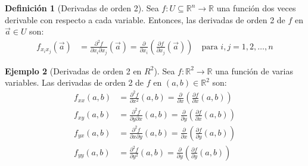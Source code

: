\documentclass{article}
\newcommand{\R}{\mathbb{R}}
\newcommand{\vect}[1]{\vec{#1}}
\theoremstyle{definition}
\newtheorem{definition}{Definición}[section]
\newtheorem{example}[definition]{Ejemplo}
\theoremstyle{plain}
\theoremstyle{remark}
\theoremstyle{corollary}
\begin{document}
\begin{definition}[Derivadas de orden 2]
Sea $f : U \subseteq \R^n \to \R$ una función dos veces derivable con respecto a cada variable. Entonces, las derivadas de orden 2 de $f$ en $\vect{a} \in U$ son:
\begin{align*}
f_{x_i x_j}(\vect{a}) &= \frac{\partial^2 f}{\partial x_i \partial x_j}(\vect{a}) = \frac{\partial}{\partial x_i} \left( \frac{\partial f}{\partial x_j}(\vect{a}) \right) \quad \text{para } i, j = 1, 2, \ldots, n
\end{align*}
\end{definition}

\begin{example}[Derivadas de orden 2 en $R^2$]
Sea $f : \R^2 \to \R$ una función de varias variables. Las derivadas de orden 2 de $f$ en $(a, b) \in \R^2$ son:
\begin{align*}
f_{xx}(a, b) &= \frac{\partial^2 f}{\partial x^2}(a, b) = \frac{\partial}{\partial x} \left( \frac{\partial f}{\partial x}(a, b) \right) \\
f_{xy}(a, b) &= \frac{\partial^2 f}{\partial y \partial x}(a, b) = \frac{\partial}{\partial y} \left( \frac{\partial f}{\partial x}(a, b) \right) \\
f_{yx}(a, b) &= \frac{\partial^2 f}{\partial x \partial y}(a, b) = \frac{\partial}{\partial x} \left( \frac{\partial f}{\partial y}(a, b) \right) \\
f_{yy}(a, b) &= \frac{\partial^2 f}{\partial y^2}(a, b) = \frac{\partial}{\partial y} \left( \frac{\partial f}{\partial y}(a, b) \right)
\end{align*}
\end{example}
\end{document}
